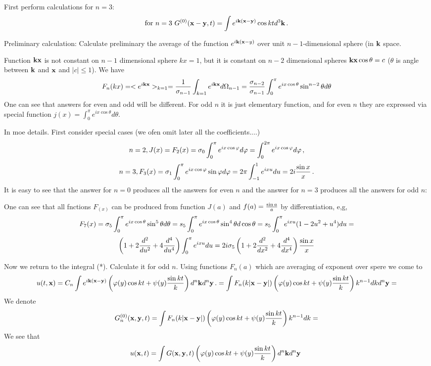 First perform calculations for $n=3$:
        $$
 \hbox{for $n=3$}\,\,  
           G^{(0)}({\bf x}-{\bf y},t)=
    \int e^{i{\bf k} ({\bf x}-{\bf y})}\cos kt d^3{\bf k} \,. 
     $$


   \medskip


  Preliminary calculation:  Calculate preliminary the average
of the function   $e^{i{\bf k}({\bf x}-y)}$ over unit $n-1$-dimensional 
 sphere  (in ${\bf k}$ space.
 
   Function ${\bf k}{\bf x}$  is not constant on $n-1$ dimensional sphere $kx=1$,
but it is constant on $n-2$ dimensional spheres ${\bf k}{\bf x}\cos\theta=c$
($\theta$ is angle between ${\bf k}$ and ${\bf x}$ and $|c|\leq 1$).
  We have
    $$
F_n(kx)= <e^{i{\bf k} {\bf x}}>_{k=1}
  ={1\over {\sigma}_{n-1}}
  \int_{k=1} e^{i{\bf k}{\bf x}} d\Omega_{n-1}=
      {{\sigma}_{n-2}\over {\sigma}_{n-1}}
   \int_0^\pi e^{ix\cos\theta}\sin^{n-2}\theta d\theta
      $$
One can see that answers for even and odd will be different.
   For odd $n$ it is just elementary function, and 
   for even $n$ they are expressed via special function
   $j(x)=\int_0^\pi e^{ix\cos\theta}d\theta$.
   
In moe details.
 First consider special cases
(we ofen omit later all the coefficients....)
         $$
n=2, J(x)=F_2(x)={\sigma}_0\int_0^{\pi} e^{ix\cos\varphi}d\varphi=
        \int_0^{2\pi} e^{ix\cos\varphi}d\varphi\,,
         $$ 
         $$
n=3, F_3(x)={\sigma}_1\int_0^{\pi} e^{ix\cos\varphi}\sin \varphi d\varphi=
        2\pi\int_{-1}^{1} e^{ix u}du=2i{\sin x\over x}\,.
         $$ 
It is easy to see that the answer for $n=0$ produces all the answers
for even $n$ and the answer for $n=3$ produces all the answers for
odd $n$:


   One can see that all fnctions $F_(x)$ can be produced from function
$J(a)$ and $f(a)={\sin a\over a}$ by differentiation, e,g,
                     $$
      F_7(x)={\sigma}_{5}
   \int_0^\pi e^{ix\cos\theta}\sin^{5}\theta d\theta=
   s_5\int_0^\pi e^{ix\cos\theta}\sin^{4}\theta d\cos\theta=
   s_5\int_0^\pi e^{ix u}(1-2u^2+u^4)du=
         $$
            $$
\left(1+2{d^2\over du^2}+4{d^4\over du^4}\right)
        \int_0^\pi e^{ix u}du=
2i{\sigma}_5\left(1+2{d^2\over dx^2}+4{d^4\over dx^4}\right)
        {\sin x\over x}
           $$

Now we return to the integral (*). Calculate it for odd $n$.
Using functions $F_n(a)$  which are averaging
of exponent over spere we come to
               $$
  u(t,{\bf x})=C_n\int e^{i{\bf k} ({\bf x}-{\bf y})}\left(\varphi(y)\cos kt+
       \psi(y){\sin kt\over k}\right)d^n{\bf k} d^n{\bf y}\,.
           =\int F_n(k|{\bf x}-{\bf y}|)\left(\varphi(y)\cos kt+
       \psi(y){\sin kt\over k}\right)k^{n-1}dk d^n {\bf y}=
              $$
We denote
             $$
     G^{(0)}_n({\bf x},{\bf y},t)=
   \int F_n(k|{\bf x}-{\bf y}|)\left(\varphi(y)\cos kt+
       \psi(y){\sin kt\over k}\right)k^{n-1}dk =
             $$
We see that
        $$
   u({\bf x},t)=
    \int G({\bf x},{\bf y},t)
    \left(\varphi(y)\cos kt+
       \psi(y){\sin kt\over k}\right)d^n{\bf k} d^n{\bf y}\
        $$
\bye

